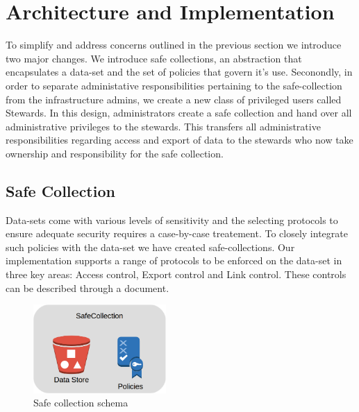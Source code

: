 \section{Architecture and Implementation}
\label{sec:architecture}


To simplify and address concerns outlined in the previous section we introduce two
major changes. We introduce safe collections, an abstraction that encapsulates
a data-set and the set of policies that govern it's use. Seconondly, in order to separate
administative responsibilities pertaining to the safe-collection from the infrastructure
admins, we create a new class of privileged users called Stewards. In this design, administrators
create a safe collection and hand over all administrative privileges to the stewards. This transfers
all administrative responsibilities regarding access and export of data to the stewards who now take
ownership and responsibility for the safe collection.

\subsection{Safe Collection}

Data-sets come with various levels of sensitivity and the selecting protocols to ensure adequate security
requires a case-by-case treatement. To closely integrate such policies with the data-set we have created
safe-collections. Our implementation supports a range of protocols to be enforced on the data-set in
three key areas: Access control, Export control and Link control. These controls can be described through a
document.

\begin{figure}
  \center
  \includegraphics[width=0.45\textwidth]{figures/safecollection.png}
  \caption{Safe collection schema}
  \label{fig:safe_schema}
  \vspace{-1.5em}
\end{figure}

